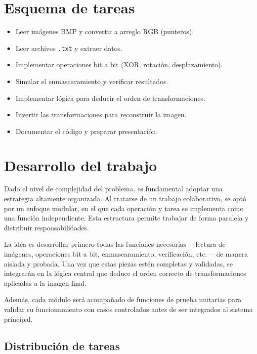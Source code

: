 \documentclass[11pt]{article}
\begin{document}
\section{Esquema de tareas}

\begin{itemize}[label=]
  \item Leer imágenes BMP y convertir a arreglo RGB (punteros). 
  \item Leer archivos \texttt{.txt} y extraer datos.
  \item Implementar operaciones bit a bit (XOR, rotación, desplazamiento).
  \item Simular el enmascaramiento y verificar resultados.
  \item Implementar lógica para deducir el orden de transformaciones.
  \item Invertir las transformaciones para reconstruir la imagen.
  \item Documentar el código y preparar presentación.
\end{itemize}


\section{Desarrollo del trabajo}

Dado el nivel de complejidad del problema, es fundamental adoptar una estrategia altamente organizada. Al tratarse de un trabajo colaborativo, se optó por un enfoque modular, en el que cada operación y tarea se implementa como una función independiente. Esta estructura permite trabajar de forma paralela y distribuir responsabilidades.

La idea es desarrollar primero todas las funciones necesarias —lectura de imágenes, operaciones bit a bit, enmascaramiento, verificación, etc.— de manera aislada y probada. Una vez que estas piezas estén completas y validadas, se integrarán en la lógica central que deduce el orden correcto de transformaciones aplicadas a la imagen final.

Además, cada módulo será acompañado de funciones de prueba unitarias para validar su funcionamiento con casos controlados antes de ser integrados al sistema principal.



\subsection*{Distribución de tareas}
\end{document}
